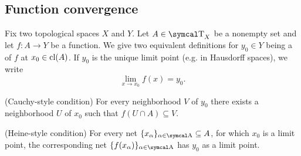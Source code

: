\subsection{Function convergence}\label{subsec:function_convergence}

\begin{definition}\label{def:convergence_of_function_at_point}
  Fix two topological spaces \( X \) and \( Y \). Let \( A \in \CT_X \) be a nonempty set and let \( f: A \to Y \) be a function. We give two equivalent definitions for \( y_0 \in Y \) being a  of \( f \) at \( x_0 \in \operatorname{cl}(A) \). If \( y_0 \) is the unique limit point (e.g. in Hausdorff spaces), we write
  \begin{equation*}
    \lim_{x \to x_0} f(x) = y_0.
  \end{equation*}

  \begin{defenum}
    (Cauchy-style condition) For every neighborhood \( V \) of \( y_0 \) there exists a neighborhood \( U \) of \( x_0 \) such that \( f(U \cap A) \subseteq V \).

    (Heine-style condition) For every net \( \{ x_\al \}_{\al \in \CA} \subseteq A \), for which \( x_0 \) is a limit point, the corresponding net \( \{ f(x_\al) \}_{\al \in \CA} \) has \( y_0 \) as a limit point.
  \end{defenum}
\end{definition}
